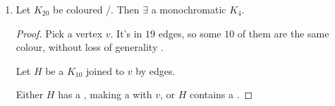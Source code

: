 \documentclass{article}
\begin{document}
\begin{eg}
\begin{enumerate}
\begin{proof}
\begin{itemize}
                        If any edge between $w, x, y, z$ is , we have a .

                        If not, they are all  and we have a .

                    \item $v$ is in  edges
                        \begin{center}
                        \end{center}

                        We know $H$ contains a monochromatic triangle. If it is , we are done.  If it is , then it makes a  with $v$ as required. \qedhere
                \end{itemize}
            \end{proof}
        \item Let $K_{20}$ be coloured /. Then $\exists$ a monochromatic $K_4$.
            \begin{proof}
                Pick a vertex $v$. It's in $19$ edges, so some $10$ of them are the same colour, without loss of generality .

                Let $H$ be a $K_{10}$ joined to $v$ by  edges.

                Either $H$ has a , making a  with $v$, or $H$ contains a .
            \end{proof}
    \end{enumerate}
\end{eg}
\end{document}
